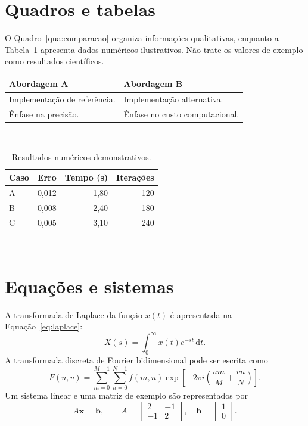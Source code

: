 \section{Quadros e tabelas}
O Quadro~\ref{qua:comparacao} organiza informações qualitativas, enquanto a Tabela~\ref{tab:resultados} apresenta dados numéricos ilustrativos. Não trate os valores de exemplo como resultados científicos.
\begin{quadro}[htbp]\centering\caption{Comparação qualitativa de abordagens.}\label{qua:comparacao}
\begin{tabularx}{\textwidth}{|X|X|}\hline
\textbf{Abordagem A} & \textbf{Abordagem B}\\\hline
Implementação de referência. & Implementação alternativa.\\\hline
Ênfase na precisão. & Ênfase no custo computacional.\\\hline
\end{tabularx}\\[2pt]
\end{quadro}

\begin{table}[htbp]\centering\caption{Resultados numéricos demonstrativos.}\label{tab:resultados}
\begin{tabular}{lrrr}\toprule Caso & Erro & Tempo (s) & Iterações\\\midrule
A & 0,012 & 1,80 & 120\\
B & 0,008 & 2,40 & 180\\
C & 0,005 & 3,10 & 240\\\bottomrule
\end{tabular}\\[2pt]
\end{table}

\section{Equações e sistemas}
A transformada de Laplace da função $x(t)$ é apresentada na Equação~\ref{eq:laplace}:
\begin{equation}\label{eq:laplace}X(s)=\int_0^\infty x(t)e^{-st}\,\mathrm{d}t.\end{equation}
A transformada discreta de Fourier bidimensional pode ser escrita como
\begin{equation}\label{eq:dft}F(u,v)=\sum_{m=0}^{M-1}\sum_{n=0}^{N-1}f(m,n)\exp\!\left[-2\pi i\left(\frac{um}{M}+\frac{vn}{N}\right)\right].\end{equation}
Um sistema linear e uma matriz de exemplo são representados por
\begin{equation}\label{eq:sistema}A\mathbf{x}=\mathbf{b},\qquad A=\begin{bmatrix}2&-1\\-1&2\end{bmatrix},\quad \mathbf{b}=\begin{bmatrix}1\\0\end{bmatrix}.\end{equation}

